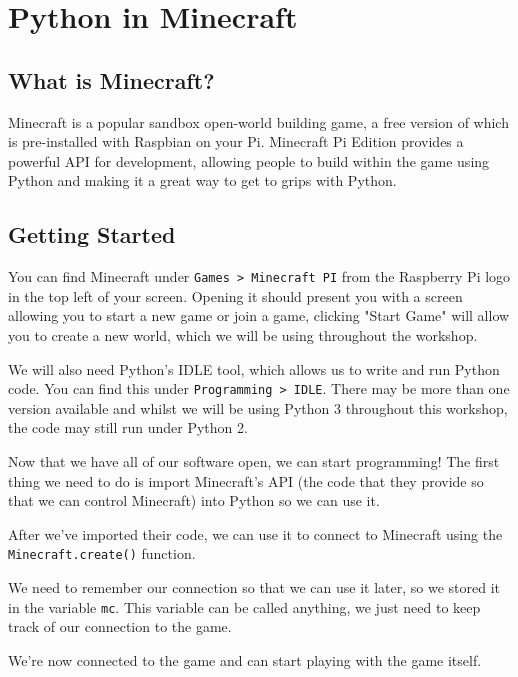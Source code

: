 \section{Python in Minecraft}

	\subsection{What is Minecraft?}

		Minecraft is a popular sandbox open-world building game, a free version of which is pre-installed with Raspbian on your Pi. Minecraft Pi Edition provides a powerful API for development, allowing people to build within the game using Python and making it a great way to get to grips with Python.

	\subsection{Getting Started}

		You can find Minecraft under \texttt{Games > Minecraft PI} from the Raspberry Pi logo in the top left of your screen. Opening it should present you with a screen allowing you to start a new game or join a game, clicking "Start Game" will allow you to create a new world, which we will be using throughout the workshop.

		We will also need Python's IDLE tool, which allows us to write and run Python code. You can find this under \texttt{Programming > IDLE}. There may be more than one version available and whilst we will be using Python 3 throughout this workshop, the code may still run under Python 2.

		Now that we have all of our software open, we can start programming! The first thing we need to do is import Minecraft's API (the code that they provide so that we can control Minecraft) into Python so we can use it.

		

		After we've imported their code, we can use it to connect to Minecraft using the \allowbreak\texttt{Minecraft\allowbreak .create()} function.

		

		We need to remember our connection so that we can use it later, so we stored it in the variable \texttt{mc}. This variable can be called anything, we just need to keep track of our connection to the game.

		We're now connected to the game and can start playing with the game itself.
